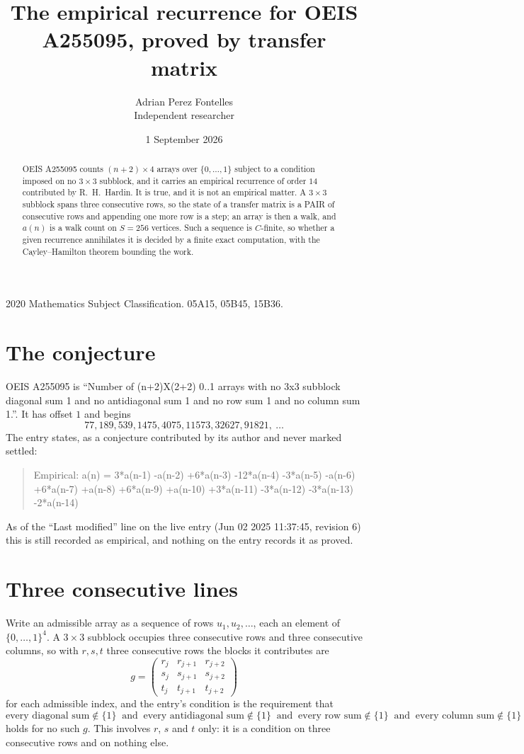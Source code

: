 \documentclass[11pt,a4paper]{article}
\title{The empirical recurrence for OEIS A255095, proved by transfer matrix}
\author{Adrian Perez Fontelles\\ \small Independent researcher}
\date{1 September 2026}
\theoremstyle{plain}
\theoremstyle{definition}
\begin{document}
\maketitle

\begin{abstract}
OEIS A255095 counts $(n+2)\times4$ arrays over $\{0,\dots,1\}$ subject to a condition imposed on
no $3\times3$ subblock, and it carries an empirical recurrence of order $14$
contributed by R.~H.~Hardin. It is true, and it is not an empirical matter. A $3\times3$
subblock spans three consecutive rows, so the state of a transfer matrix is a PAIR of
consecutive rows and appending one more row is a step; an array is then a walk, and
$a(n)$ is a walk count on $S=256$ vertices. Such a sequence is $C$-finite, so whether a given
recurrence annihilates it is decided by a finite exact computation, with the Cayley--Hamilton
theorem bounding the work.
\end{abstract}

\noindent\small 2020 Mathematics Subject Classification. 05A15, 05B45, 15B36.\normalsize

\section{The conjecture}

OEIS A255095 is ``Number of (n+2)X(2+2) 0..1 arrays with no 3x3 subblock diagonal sum 1 and no antidiagonal sum 1 and no row sum 1 and no column sum 1.''. It has offset $1$ and begins
\[
77, 189, 539, 1475, 4075, 11573, 32627, 91821,\ \dots
\]
The entry states, as a conjecture contributed by its author and never marked settled:
\begin{quote}
Empirical: a(n) = 3*a(n-1) -a(n-2) +6*a(n-3) -12*a(n-4) -3*a(n-5) -a(n-6) +6*a(n-7) +a(n-8) +6*a(n-9) +a(n-10) +3*a(n-11) -3*a(n-12) -3*a(n-13) -2*a(n-14)
\end{quote}
As of the ``Last modified'' line on the live entry (Jun 02 2025 11:37:45, revision 6) this is still
recorded as empirical, and nothing on the entry records it as proved.

\section{Three consecutive lines}

Write an admissible array as a sequence of rows $u_1,u_2,\dots$, each an element of
$\{0,\dots,1\}^{4}$. A $3\times3$ subblock occupies three consecutive rows and
three consecutive columns, so with $r,s,t$ three consecutive rows the blocks it
contributes are
\[
g=\begin{pmatrix}r_j&r_{j+1}&r_{j+2}\\ s_j&s_{j+1}&s_{j+2}\\ t_j&t_{j+1}&t_{j+2}\end{pmatrix}
\]
for each admissible index, and the entry's condition is the requirement that
\[
\text{every diagonal sum} \notin \{1\}\ \text{ and }\ \text{every antidiagonal sum} \notin \{1\}\ \text{ and }\ \text{every row sum} \notin \{1\}\ \text{ and }\ \text{every column sum} \notin \{1\}
\]
holds for no such $g$. This involves $r$, $s$ and $t$ only: it is a condition on
three consecutive rows and on nothing else.
\end{document}
